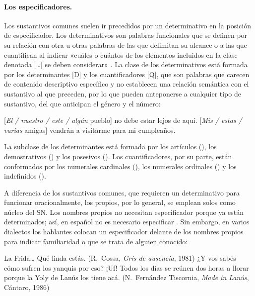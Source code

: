 \paragraph{Los especificadores.} Los sustantivos comunes suelen ir precedidos
por un determinativo en la posición de especificador. Los determinativos son
palabras funcionales que se definen por su relación con otra u otras palabras de
las que delimitan su alcance o a las que cuantifican al indicar «cuáles o
cuántos de los elementos incluidos en la clase denotada [\ldots] se deben
considerar» \parencite[93]{rodriguezramalle2005}. La clase de los determinativos
está formada por los determinantes [D] y los cuantificadores [Q], que son
palabras que carecen de contenido descriptivo específico y no establecen una
relación semántica con el sustantivo al que preceden, por lo que pueden
anteponerse a cualquier tipo de sustantivo, del que anticipan el género y el
número:

\begin{exe}
  \ex {}[\textit{El / nuestro / este / algún} pueblo] no debe estar lejos de
      aquí.
  \ex {}[\textit{Mis / estas / varias} amigas] vendrán a visitarme para mi
      cumpleaños.
\end{exe}

La subclase de los determinantes está formada por los artículos (), los demostrativos () y los posesivos
(). Los cuantificadores, por su parte, están conformados
por los numerales cardinales (), los numerales ordinales
() y los indefinidos ().

A diferencia de los sustantivos comunes, que requieren un determinativo para
funcionar oracionalmente, los propios, por lo general, se emplean solos como
núcleo del SN. Los nombres propios no necesitan especificador porque ya están
determinados; así, en español no es necesario especificar . Sin embargo, en varios dialectos los hablantes colocan un especificador
delante de los nombres propios para indicar familiaridad o que se trata de
alguien conocido:

\begin{exe}
  \ex
    \begin{xlist}
      \ex La Frida\ldots{} Qué linda estás. (R.~Cossa, \textit{Gris de
          ausencia}, 1981)
      \ex ¿Y vos sabés cómo sufren los yanquis por eso? ¡Uf! Todos los días se
          reúnen dos horas a llorar porque la Yoly de Lanús los tiene acá.
          (N.~Fernández Tiscornia, \textit{Made in Lanús}, Cántaro, 1986)
    \end{xlist}
\end{exe}

